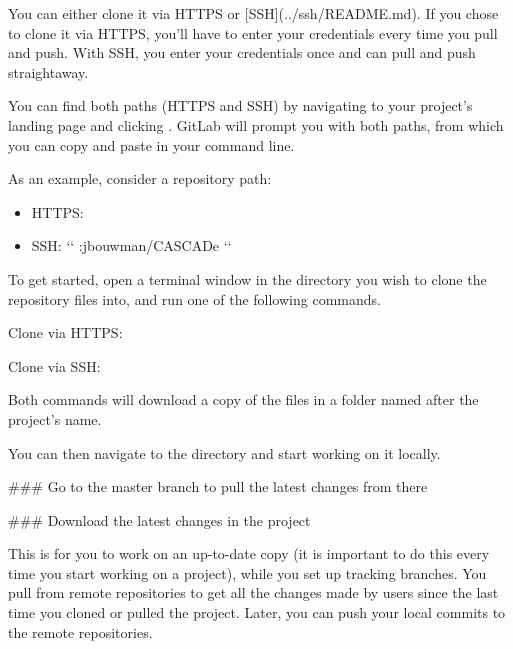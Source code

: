 \documentclass[a4paper,10pt,english]{sphinxmanual}
\begin{document}
You can either clone it via HTTPS or {[}SSH{]}(../ssh/README.md).
If you chose to clone it via HTTPS, you’ll have to enter your
credentials every time you pull and push. With SSH, you enter
your credentials once and can pull and push straightaway.

You can find both paths (HTTPS and SSH) by navigating to
your project’s landing page and clicking . GitLab
will prompt you with both paths, from which you can copy
and paste in your command line.

As an example, consider a repository path:
\begin{itemize}
\item {} 
HTTPS: 

\item {} 
SSH: {}`{}` :jbouwman/CASCADe {}`{}`

\end{itemize}

To get started, open a terminal window in the directory
you wish to clone the repository files into, and run one
of the following commands.

Clone via HTTPS:


Clone via SSH:


Both commands will download a copy of the files in a
folder named after the project’s name.

You can then navigate to the directory and start working
on it locally.

\#\#\# Go to the master branch to pull the latest changes from there


\#\#\# Download the latest changes in the project

This is for you to work on an up-to-date copy (it is important to do this every time you start working on a project), while you set up tracking branches. You pull from remote repositories to get all the changes made by users since the last time you cloned or pulled the project. Later, you can push your local commits to the remote repositories.

\end{document}
